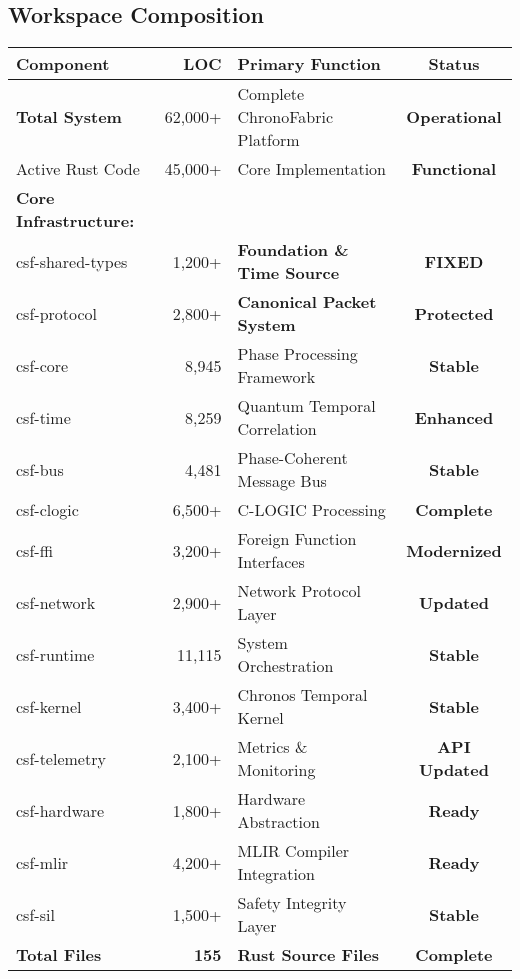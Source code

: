 \documentclass[11pt,a4paper]{article}
\newcommand{\success}[1]{\textcolor{successgreen}{\textbf{#1}}}
\begin{document}
\subsection{Workspace Composition}
\begin{center}
\begin{tabular}{|l|r|l|c|}
\hline
\textbf{Component} & \textbf{LOC} & \textbf{Primary Function} & \textbf{Status} \\
\hline
\textbf{Total System} & 62,000+ & Complete ChronoFabric Platform & \success{Operational} \\
Active Rust Code & 45,000+ & Core Implementation & \success{Functional} \\
\hline
\textbf{Core Infrastructure:} & & & \\
csf-shared-types & 1,200+ & \textbf{Foundation \& Time Source} & \success{\textbf{FIXED}} \\
csf-protocol & 2,800+ & \textbf{Canonical Packet System} & \success{\textbf{Protected}} \\
csf-core & 8,945 & Phase Processing Framework & \success{Stable} \\
csf-time & 8,259 & Quantum Temporal Correlation & \success{Enhanced} \\
csf-bus & 4,481 & Phase-Coherent Message Bus & \success{Stable} \\
csf-clogic & 6,500+ & C-LOGIC Processing & \success{\textbf{Complete}} \\
csf-ffi & 3,200+ & Foreign Function Interfaces & \success{\textbf{Modernized}} \\
csf-network & 2,900+ & Network Protocol Layer & \success{Updated} \\
csf-runtime & 11,115 & System Orchestration & \success{Stable} \\
csf-kernel & 3,400+ & Chronos Temporal Kernel & \success{Stable} \\
csf-telemetry & 2,100+ & Metrics \& Monitoring & \success{API Updated} \\
csf-hardware & 1,800+ & Hardware Abstraction & \success{Ready} \\
csf-mlir & 4,200+ & MLIR Compiler Integration & \success{Ready} \\
csf-sil & 1,500+ & Safety Integrity Layer & \success{Stable} \\
\hline
\textbf{Total Files} & \textbf{155} & \textbf{Rust Source Files} & \success{Complete} \\
\hline
\end{tabular}
\end{center}
\end{document}
